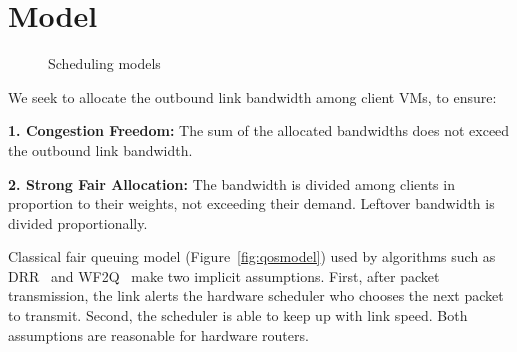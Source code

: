 \section{Model}
\label{sec:model}
\begin{figure}[t]
\center
{}
\vspace{-0.2em}
\caption{Scheduling models}
\label{fig:sched_mod}
\vspace{-0.5em}
\end{figure}
We seek to allocate the outbound link bandwidth among client VMs, to ensure:  

{\bf 1. Congestion Freedom:}  The sum of the allocated bandwidths does not
exceed the outbound link bandwidth.

{\bf 2. Strong Fair Allocation: } The bandwidth is divided among clients in
proportion to their weights, not exceeding their demand. Leftover bandwidth is
divided proportionally.

Classical fair queuing model (Figure~\ref{fig:qosmodel}) used by algorithms such
as DRR~\cite{drr} and WF2Q~\cite{wf2q} make two implicit assumptions. First,
after packet transmission, the link alerts the hardware scheduler who chooses the
next packet to transmit. Second, the scheduler is able to keep up with link
speed.  Both assumptions are reasonable for hardware routers.

